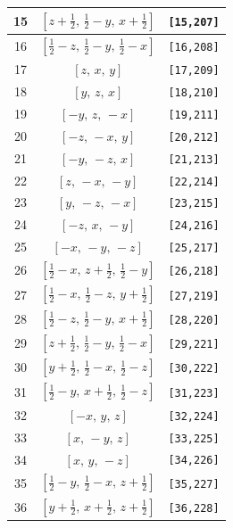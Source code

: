 \documentclass[fleqn,8pt]{jsarticle}
\begin{document}
\begin{longtable}{ccc}
15 & $\left[ z + \frac{1}{2},\, \frac{1}{2} - y,\, x + \frac{1}{2} \right]$ & {\tt [15,207]} \\ \hline
16 & $\left[ \frac{1}{2} - z,\, \frac{1}{2} - y,\, \frac{1}{2} - x \right]$ & {\tt [16,208]} \\ \hline
17 & $\left[ z,\, x,\, y \right]$ & {\tt [17,209]} \\ \hline
18 & $\left[ y,\, z,\, x \right]$ & {\tt [18,210]} \\ \hline
19 & $\left[ - y,\, z,\, - x \right]$ & {\tt [19,211]} \\ \hline
20 & $\left[ - z,\, - x,\, y \right]$ & {\tt [20,212]} \\ \hline
21 & $\left[ - y,\, - z,\, x \right]$ & {\tt [21,213]} \\ \hline
22 & $\left[ z,\, - x,\, - y \right]$ & {\tt [22,214]} \\ \hline
23 & $\left[ y,\, - z,\, - x \right]$ & {\tt [23,215]} \\ \hline
24 & $\left[ - z,\, x,\, - y \right]$ & {\tt [24,216]} \\ \hline
25 & $\left[ - x,\, - y,\, - z \right]$ & {\tt [25,217]} \\ \hline
26 & $\left[ \frac{1}{2} - x,\, z + \frac{1}{2},\, \frac{1}{2} - y \right]$ & {\tt [26,218]} \\ \hline
27 & $\left[ \frac{1}{2} - x,\, \frac{1}{2} - z,\, y + \frac{1}{2} \right]$ & {\tt [27,219]} \\ \hline
28 & $\left[ \frac{1}{2} - z,\, \frac{1}{2} - y,\, x + \frac{1}{2} \right]$ & {\tt [28,220]} \\ \hline
29 & $\left[ z + \frac{1}{2},\, \frac{1}{2} - y,\, \frac{1}{2} - x \right]$ & {\tt [29,221]} \\ \hline
30 & $\left[ y + \frac{1}{2},\, \frac{1}{2} - x,\, \frac{1}{2} - z \right]$ & {\tt [30,222]} \\ \hline
31 & $\left[ \frac{1}{2} - y,\, x + \frac{1}{2},\, \frac{1}{2} - z \right]$ & {\tt [31,223]} \\ \hline
32 & $\left[ - x,\, y,\, z \right]$ & {\tt [32,224]} \\ \hline
33 & $\left[ x,\, - y,\, z \right]$ & {\tt [33,225]} \\ \hline
34 & $\left[ x,\, y,\, - z \right]$ & {\tt [34,226]} \\ \hline
35 & $\left[ \frac{1}{2} - y,\, \frac{1}{2} - x,\, z + \frac{1}{2} \right]$ & {\tt [35,227]} \\ \hline
36 & $\left[ y + \frac{1}{2},\, x + \frac{1}{2},\, z + \frac{1}{2} \right]$ & {\tt [36,228]} \\ \hline

\end{longtable}
\end{document}
